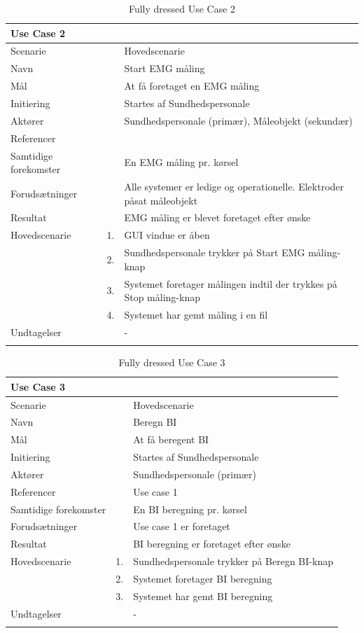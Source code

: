 \documentclass[main.tex]{subfiles}
\begin{document}
\begin{longtabu} to  %
	{\large \textbf{Use Case 2}} && \\
	\toprule
	Scenarie 				&&	Hovedscenarie\\
	Navn 					&& 	Start EMG måling\\
	Mål 					&& 	At få foretaget en EMG måling\\
	Initiering 				&& 	Startes af Sundhedspersonale\\
	Aktører 				&& 	Sundhedspersonale (primær), Måleobjekt (sekundær)\\
	Referencer 				&& 	\\
	Samtidige forekomster  	&& 	En EMG måling pr. kørsel \\
	Forudsætninger 			&&	Alle systemer er ledige og operationelle. Elektroder påsat måleobjekt\\ 
	Resultat 				&& 	EMG måling er blevet foretaget efter ønske\\ \midrule
	Hovedscenarie 			&    1. 	&	GUI vindue er åben\\				 	
							&    2. 	& 	Sundhedspersonale trykker på Start EMG måling-knap\\ 
							& 	 3.		&	 Systemet foretager målingen indtil der trykkes på Stop måling-knap \\[-1ex]
                            & 	 4.		&	 Systemet har gemt måling i en fil \\[-1ex]
	Undtagelser 			&			& 	-  \\ \bottomrule
	
	\caption{Fully dressed Use Case 2}
	\label{UC2}
\end{longtabu}

\begin{longtabu} to  %
	{\large \textbf{Use Case 3}} && \\
	\toprule
	Scenarie 				&&	Hovedscenarie\\
	Navn 					&& 	Beregn BI\\
	Mål 					&& 	At få beregent BI\\
	Initiering 				&& 	Startes af Sundhedspersonale\\
	Aktører 				&& 	Sundhedspersonale (primær)\\
	Referencer 				&& 	Use case 1\\
	Samtidige forekomster  	&& 	En BI beregning pr. kørsel \\
	Forudsætninger 			&&	Use case 1 er foretaget\\ 
	Resultat 				&& 	BI beregning er foretaget efter ønske\\ \midrule
	Hovedscenarie 			&    1. 	&	Sundhedspersonale trykker på Beregn BI-knap\\	
							&    2. 	& 	Systemet foretager BI beregning\\ 
							& 	 3.		&	Systemet har gemt BI beregning \\[-1ex]
    Undtagelser 			&			& 	-  \\ \bottomrule
	
	\caption{Fully dressed Use Case 3}
	\label{UC3}
\end{longtabu}
\end{document}
